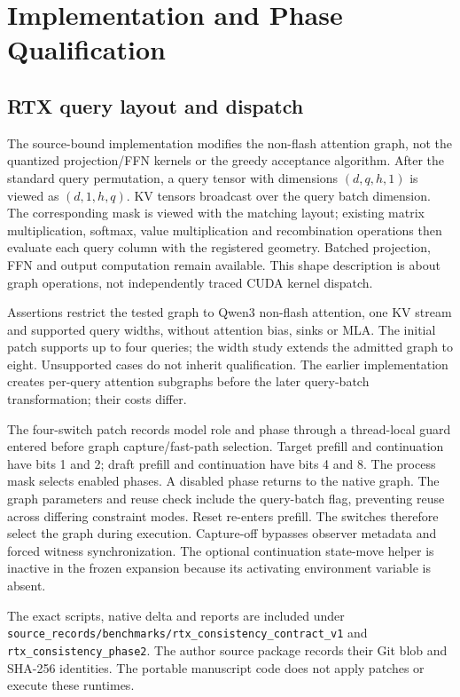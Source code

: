 \section{Implementation and Phase Qualification}
\label{supp:implementation}
\subsection{RTX query layout and dispatch}
\label{supp:query_layout}
The source-bound implementation modifies the non-flash attention graph, not the quantized projection/FFN kernels or the greedy acceptance algorithm. After the standard query permutation, a query tensor with dimensions $(d,q,h,1)$ is viewed as $(d,1,h,q)$. KV tensors broadcast over the query batch dimension. The corresponding mask is viewed with the matching layout; existing matrix multiplication, softmax, value multiplication and recombination operations then evaluate each query column with the registered geometry. Batched projection, FFN and output computation remain available. This shape description is about graph operations, not independently traced CUDA kernel dispatch.

Assertions restrict the tested graph to Qwen3 non-flash attention, one KV stream and supported query widths, without attention bias, sinks or MLA. The initial patch supports up to four queries; the width study extends the admitted graph to eight. Unsupported cases do not inherit qualification. The earlier implementation creates per-query attention subgraphs before the later query-batch transformation; their costs differ.

The four-switch patch records model role and phase through a thread-local guard entered before graph capture/fast-path selection. Target prefill and continuation have bits 1 and 2; draft prefill and continuation have bits 4 and 8. The process mask selects enabled phases. A disabled phase returns to the native graph. The graph parameters and reuse check include the query-batch flag, preventing reuse across differing constraint modes. Reset re-enters prefill. The switches therefore select the graph during execution. Capture-off bypasses observer metadata and forced witness synchronization. The optional continuation state-move helper is inactive in the frozen expansion because its activating environment variable is absent.

The exact scripts, native delta and reports are included under \nolinkurl{source_records/benchmarks/rtx_consistency_contract_v1} and \nolinkurl{rtx_consistency_phase2}. The author source package records their Git blob and SHA-256 identities. The portable manuscript code does not apply patches or execute these runtimes.

